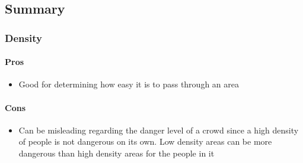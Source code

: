 \subsection{Summary}\label{sec:crowd_conditions_summary}


\subsubsection{Density}


\paragraph{Pros}
\begin{itemize}
    \item Good for determining how easy it is to pass through an area
\end{itemize}

\paragraph{Cons}
\begin{itemize}
    \item Can be misleading regarding the danger level of a crowd since a high density of people is not dangerous on its own. Low density areas can be more dangerous than high density areas for the people in it
\end{itemize}

